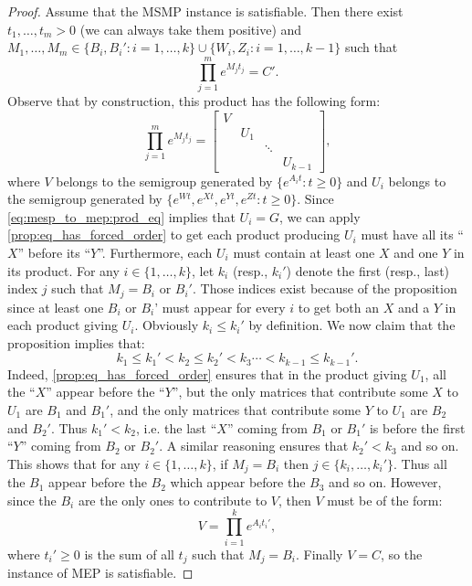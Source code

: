 \documentclass[format=acmsmall, review=false, screen=true]{acmart}
\begin{document}
\begin{proof}
Assume that the MSMP instance is satisfiable. Then there exist $t_1,\ldots,t_m>0$ (we can always take them positive)
and $M_1,\ldots,M_m\in\big\lbrace B_{i},B_{i}':i=1,\ldots,k\rbrace\cup\big\lbrace W_{i},Z_{i}:i=1,\ldots,k-1\big\rbrace$
such that
\begin{equation}\label{eq:mesp_to_mep:prod_eq}
\prod_{j=1}^{m}e^{M_{j}t_{j}}=C'.
\end{equation}
Observe that by construction, this product has the following form:
\[\prod_{j=1}^{m}e^{M_{j}t_{j}}=\begin{bmatrix}V&&&\\&U_1&&\\&&\ddots&\\&&&U_{k-1}\end{bmatrix},\]
where $V$ belongs to the semigroup generated by $\lbrace e^{A_{i}t}:t\geqslant0\rbrace$ and $U_{i}$ belongs
to the semigroup generated by $\lbrace e^{Wt},e^{Xt},e^{Yt},e^{Zt}:t\geqslant0\rbrace$. Since
\eqref{eq:mesp_to_mep:prod_eq} implies that $U_{i}=G$, we can apply \cref{prop:eq_has_forced_order}
to get each product producing $U_{i}$ must have all its ``$X$'' before its ``$Y$''. Furthermore, each $U_{i}$
must contain at least one $X$ and one $Y$ in its product. For any $i\in\lbrace 1,\ldots,k\rbrace$,
let $k_{i}$ (resp., $k_{i}'$) denote
the first (resp., last) index $j$ such that $M_{j}=B_{i}\text{ or }B_{i}'$. Those indices exist because
of the proposition since at least one $B_{i}$ or $B_{i}$' must appear for every $i$
to get both an $X$ and a $Y$ in each product giving $U_{i}$. Obviously $k_{i}\leqslant k_{i}'$
by definition. We now claim that the proposition implies that:
\[k_1\leqslant k_1'<k_2\leqslant k_2'<k_3\cdots<k_{k-1}\leqslant k_{k-1}'.\]
Indeed, \cref{prop:eq_has_forced_order} ensures that in the product giving $U_1$,
all the ``$X$'' appear before the ``$Y$'',
but the only matrices that contribute some $X$ to $U_1$ are $B_1$ and $B_1'$,
and the only matrices that contribute some $Y$ to $U_1$ are $B_2$ and $B_2'$.
Thus $k_1'<k_2$, i.e. the last ``$X$'' coming from $B_1$ or $B_1'$ is before the first ``$Y$''
coming from $B_2$ or $B_2'$. A similar reasoning ensures that $k_2'<k_3$ and so on.
This shows that for any $i\in\lbrace 1,\ldots,k\rbrace$, if $M_{j}=B_{i}$ then $j\in\lbrace k_{i},\ldots,k_{i}'\rbrace$. Thus all
the $B_1$ appear before the $B_2$ which appear before the $B_3$ and so on.
However, since the $B_{i}$ are the only ones to contribute to $V$, then $V$ must be of the form:
\[V=\prod_{i=1}^{k}e^{A_{i}t_{i}'},\]
where $t_{i}'\geqslant0$ is the sum of all $t_{j}$ such that $M_{j}=B_{i}$.
Finally $V=C$, so the instance of MEP is satisfiable.

\end{proof}
\end{document}
